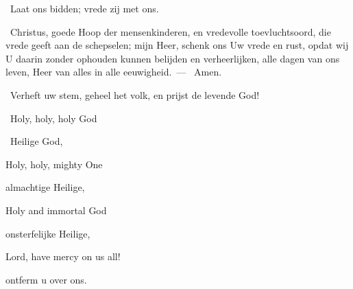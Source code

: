 \documentclass[12pt,twoside,a5paper]{article}
\begin{document}
\begin{halfparskip}
  \rr~Laat ons bidden; vrede zij met ons.

  \cc~Christus, goede Hoop der mensenkinderen, en vredevolle toevluchtsoord, die vrede geeft aan de schepselen; mijn Heer, schenk ons Uw vrede en rust, opdat wij U daarin zonder ophouden kunnen belijden en verheerlijken, alle dagen van ons leven, Heer van alles in alle eeuwigheid.~--- \rr~Amen.
\end{halfparskip}



\dd~Verheft uw stem, geheel het volk, en prijst de levende God!

\begin{doublecols}
  \englishl \rr~Holy, holy, holy God

   \rr~Heilige God,

  \englishl Holy, holy, mighty One

   almachtige Heilige,

  \englishl Holy and immortal God

   onsterfelijke Heilige,

  \englishl Lord, have mercy on us all!

   ontferm u over ons.
\end{doublecols}
\end{document}
